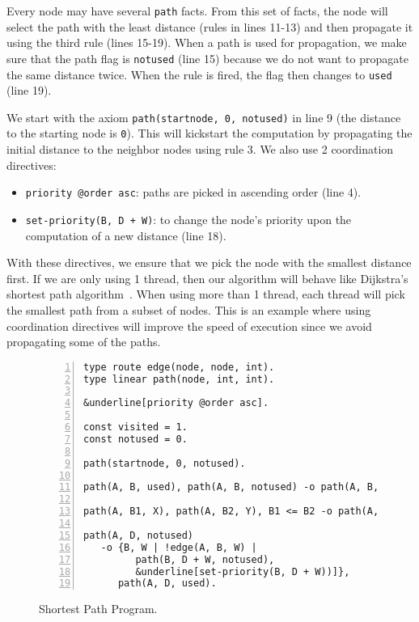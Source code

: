Every node may have several \texttt{path} facts. From this set of facts, the node will select
the path with the least distance (rules in lines 11-13) and then propagate it using the third rule (lines 15-19).
When a path is used for propagation, we make sure that the path flag is \texttt{notused} (line 15)
because we do not want to propagate the same distance twice. When the rule is fired, the flag
then changes to \texttt{used} (line 19).

We start with the axiom \texttt{path(startnode,~0,~notused)} in line 9 (the distance to the starting
node is \texttt{0}). This will kickstart the computation by propagating the initial distance to the
neighbor nodes using rule 3. We also use 2 coordination directives:

\begin{itemize}
   \item \texttt{priority~@order~asc}: paths are picked in ascending order (line 4).
   \item \texttt{set-priority(B,~D~+~W)}: to change the node's priority upon the computation of
a new distance (line 18).
\end{itemize}

With these directives, we ensure that we pick the node with the smallest distance
first. If we are only using 1 thread, then our algorithm will behave like Dijkstra's shortest
path algorithm~\cite{Dijkstra}. When using more than 1 thread, each thread will pick the smallest
path from a subset of nodes. This is an example where using coordination directives will
improve the speed of execution since we avoid propagating some of the paths.

\begin{figure}[h!]
\small\begin{Verbatim}[numbers=left,commandchars=&\[\]]
type route edge(node, node, int).
type linear path(node, int, int).

&underline[priority @order asc].

const visited = 1.
const notused = 0.

path(startnode, 0, notused).

path(A, B, used), path(A, B, notused) -o path(A, B, used).

path(A, B1, X), path(A, B2, Y), B1 <= B2 -o path(A, B1, X).

path(A, D, notused)
   -o {B, W | !edge(A, B, W) |
         path(B, D + W, notused),
         &underline[set-priority(B, D + W))]},
      path(A, D, used).
\end{Verbatim}
  \caption{Shortest Path Program.}
  \label{code:shortest_path_program}
\end{figure}
\normalsize
